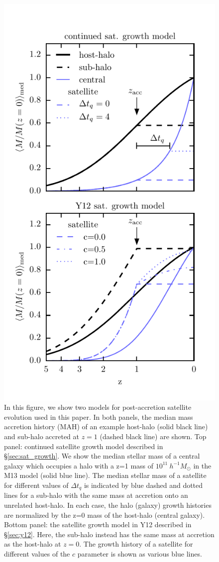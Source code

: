 \documentclass[a4paper,fleqn,usenatbib]{mnras}
\begin{document}
\begin{figure}
    \includegraphics{figures/sat_growth_model_2_panel.pdf}
    \caption{In this figure, we show two models for post-accretion satellite evolution used in this paper.  In both panels, the median mass accretion history (MAH) of an example host-halo (solid black line) and sub-halo accreted at $z=1$ (dashed black line) are shown. Top panel: continued satellite growth model described in \S \ref{sec:sat_growth}.  We show the median stellar mass of a central galaxy which occupies a halo with a z=1 mass of $10^{11}~h^{-1}M_{\odot}$ in the M13 model (solid blue line).  The median stellar mass of a satellite for different values of $\Delta t_q$  is indicated by blue dashed and dotted lines for a sub-halo with the same mass at accretion onto an unrelated host-halo.  In each case, the halo (galaxy) growth histories are normalized by the z=0 mass of the host-halo (central galaxy).  Bottom panel: the satellite growth model in Y12 described in \S \ref{sec:y12}.  Here, the sub-halo instead has the same mass at accretion as the host-halo at $z=0$.  The growth history of a satellite for different values of the $c$ parameter is shown as various blue lines.}

\end{figure}
\end{document}
